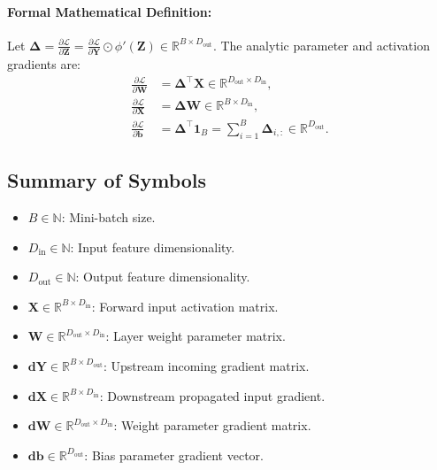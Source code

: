 \documentclass[11pt]{article}
\begin{document}
\paragraph{Formal Mathematical Definition:}
Let $\mathbf{\Delta} = \frac{\partial \mathcal{L}}{\partial \mathbf{Z}} = \frac{\partial \mathcal{L}}{\partial \mathbf{Y}} \odot \phi'(\mathbf{Z}) \in \mathbb{R}^{B \times D_{\mathrm{out}}}$.
The analytic parameter and activation gradients are:
\begin{align}
\label{eq:grad_w}
\frac{\partial \mathcal{L}}{\partial \mathbf{W}} &= \mathbf{\Delta}^\top \mathbf{X} \in \mathbb{R}^{D_{\mathrm{out}} \times D_{\mathrm{in}}}, \\
\label{eq:grad_x}
\frac{\partial \mathcal{L}}{\partial \mathbf{X}} &= \mathbf{\Delta} \mathbf{W} \in \mathbb{R}^{B \times D_{\mathrm{in}}}, \\
\label{eq:grad_b}
\frac{\partial \mathcal{L}}{\partial \mathbf{b}} &= \mathbf{\Delta}^\top \mathbf{1}_B = \sum_{i=1}^B \mathbf{\Delta}_{i, :} \in \mathbb{R}^{D_{\mathrm{out}}}.
\end{align}

\subsection{Summary of Symbols}
\begin{itemize}
    \item $B \in \mathbb{N}$: Mini-batch size.
    \item $D_{\mathrm{in}} \in \mathbb{N}$: Input feature dimensionality.
    \item $D_{\mathrm{out}} \in \mathbb{N}$: Output feature dimensionality.
    \item $\mathbf{X} \in \mathbb{R}^{B \times D_{\mathrm{in}}}$: Forward input activation matrix.
    \item $\mathbf{W} \in \mathbb{R}^{D_{\mathrm{out}} \times D_{\mathrm{in}}}$: Layer weight parameter matrix.
    \item $\mathbf{dY} \in \mathbb{R}^{B \times D_{\mathrm{out}}}$: Upstream incoming gradient matrix.
    \item $\mathbf{dX} \in \mathbb{R}^{B \times D_{\mathrm{in}}}$: Downstream propagated input gradient.
    \item $\mathbf{dW} \in \mathbb{R}^{D_{\mathrm{out}} \times D_{\mathrm{in}}}$: Weight parameter gradient matrix.
    \item $\mathbf{db} \in \mathbb{R}^{D_{\mathrm{out}}}$: Bias parameter gradient vector.
\end{itemize}
\end{document}
